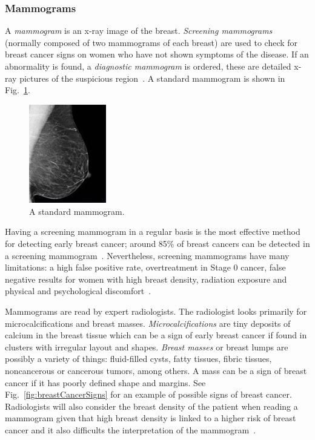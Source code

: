 \subsubsection{Mammograms}
A \emph{mammogram} is an x-ray image of the breast. \emph{Screening mammograms} (normally composed of two mammograms of each breast) are used to check for breast cancer signs on women who have not shown symptoms of the disease. If an abnormality is found, a \emph{diagnostic mammogram} is ordered, these are detailed x-ray pictures of the suspicious region~\cite{Mammograms2014}. A standard mammogram is shown in Fig.~\ref{fig:normalMammogram}.

\begin{figure}[h]
	\centering
	\includegraphics[width = 0.3\textwidth]{plots/normalMammogram.jpg}
	\caption[Digital Mammogram]{A standard mammogram.}
	\label{fig:normalMammogram}
\end{figure}

Having a screening mammogram in a regular basis is the most effective method for detecting early breast cancer; around 85\% of breast cancers can be detected in a screening mammogram~\cite{PerformanceMammography2013}. Nevertheless, screening mammograms have many limitations: a high false positive rate, overtreatment in Stage 0 cancer, false negative results for women with high breast density, radiation exposure and physical and psychological discomfort~\cite{Mammograms2014}.

Mammograms are read by expert radiologists. The radiologist looks primarily for microcalcifications and breast masses. \emph{Microcalcifications} are tiny deposits of calcium in the breast tissue which can be a sign of early breast cancer if found in clusters with irregular layout and shapes. \emph{Breast masses} or breast lumps are possibly a variety of things: fluid-filled cysts, fatty tissues, fibric tissues, noncancerous or cancerous tumors, among others. A mass can be a sign of breast cancer if it has poorly defined shape and margins. See Fig.~\ref{fig:breastCancerSigns} for an example of possible signs of breast cancer. Radiologists will also consider the breast density of the patient when reading a mammogram given that high breast density is linked to a higher risk of breast cancer and it also difficults the interpretation of the mammogram~\cite{MammogramsACS2014}.

